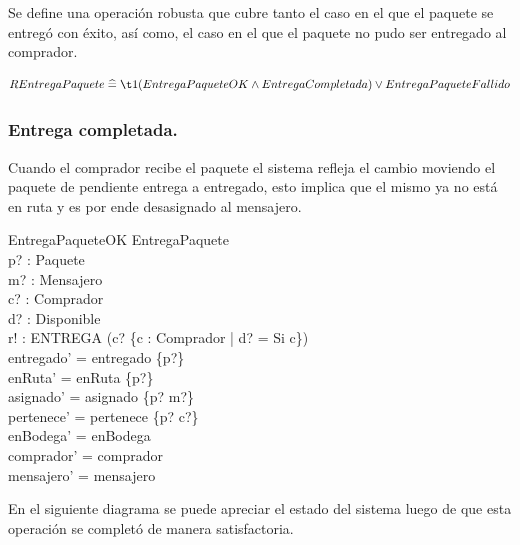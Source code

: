 \documentclass[12pt,a4paper]{article}
\renewcommand*{\defs}{\mathrel{\widehat{=}}}
\begin{document}
Se define una operación robusta que cubre tanto el caso en el que el paquete se entregó con éxito, así como, el caso en el que el paquete no pudo ser entregado al comprador.

\[ REntregaPaquete \defs\\ 
\t1 (EntregaPaqueteOK \wedge EntregaCompletada)
\lor EntregaPaqueteFallido \]

\subsubsection*{Entrega completada.}
Cuando el comprador recibe el paquete el sistema refleja el cambio moviendo el paquete de pendiente entrega a entregado, esto implica que el mismo ya no está en ruta y es por ende desasignado al mensajero.

\begin{schema}{EntregaPaqueteOK}
\Delta EntregaPaquete\\
p? : Paquete\\
m? : Mensajero\\
c? : Comprador\\
d? : Disponible\\
r! : ENTREGA
\where
(c? \in \{c : Comprador | d? = Si \spot c\})\\
entregado' = entregado \cup \{p?\}\\
enRuta' = enRuta \setminus \{p?\}\\
asignado' = asignado \setminus \{p? \mapsto m?\}\\
pertenece' = pertenece \setminus \{p? \mapsto c?\}\\
enBodega' = enBodega\\
comprador' = comprador\\
mensajero' = mensajero
\end{schema}

En el siguiente diagrama se puede apreciar el estado del sistema luego de que esta operación se completó de manera satisfactoria.
\end{document}

